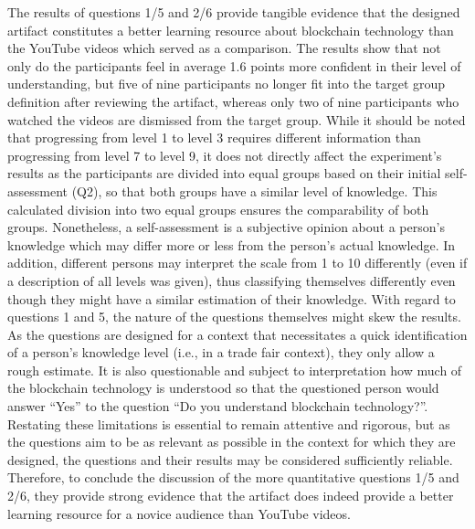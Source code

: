 The results of questions 1/5 and 2/6 provide tangible evidence that the designed artifact constitutes a better learning resource about blockchain technology than the YouTube videos which served as a comparison. The results show that not only do the participants feel in average 1.6 points more confident in their level of understanding, but five of nine participants no longer fit into the target group definition after reviewing the artifact, whereas only two of nine participants who watched the videos are dismissed from the target group. While it should be noted that progressing from level 1 to level 3 requires different information than progressing from level 7 to level 9, it does not directly affect the experiment's results as the participants are divided into equal groups based on their initial self-assessment (Q2), so that both groups have a similar level of knowledge. This calculated division into two equal groups ensures the comparability of both groups. Nonetheless, a self-assessment is a subjective opinion about a person's knowledge which may differ more or less from the person's actual knowledge. In addition, different persons may interpret the scale from 1 to 10 differently (even if a description of all levels was given), thus classifying themselves differently even though they might have a similar estimation of their knowledge. With regard to questions 1 and 5, the nature of the questions themselves might skew the results. As the questions are designed for a context that necessitates a quick identification of a person's knowledge level (i.e., in a trade fair context), they only allow a rough estimate. It is also questionable and subject to interpretation how much of the blockchain technology is understood so that the questioned person would answer \enquote{Yes} to the question \enquote{Do you understand blockchain technology?}. Restating these limitations is essential to remain attentive and rigorous, but as the questions aim to be as relevant as possible in the context for which they are designed, the questions and their results may be considered sufficiently reliable. Therefore, to conclude the discussion of the more quantitative questions 1/5 and 2/6, they provide strong evidence that the artifact does indeed provide a better learning resource for a novice audience than YouTube videos.

